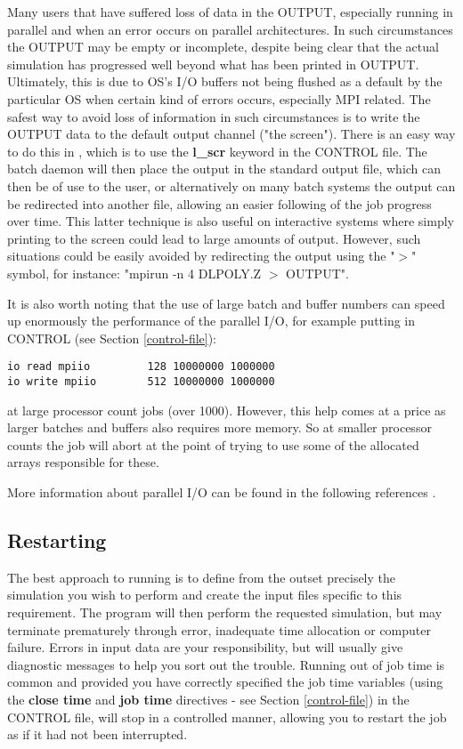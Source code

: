 Many users that have suffered loss of data in the OUTPUT, especially
running in parallel and when an error occurs on parallel architectures.
In such circumstances the OUTPUT may be empty or incomplete, despite
being clear that the actual simulation has progressed well beyond what
has been printed in OUTPUT.  Ultimately, this is due to OS's I/O
buffers not being flushed as a default by the particular OS when
certain kind of errors occurs, especially MPI related.  The safest way
to avoid loss of information in such circumstances is to write the
OUTPUT data to the default output channel ("the screen").  There is an
easy way to do this in \D, which is to use the {\bf l\_scr} keyword in
the CONTROL file.  The batch daemon will then place the output in the
standard output file, which can then be of use to the user, or
alternatively on many batch systems the output can be redirected into
another file, allowing an easier following of the job progress over
time.  This latter technique is also useful on interactive systems
where simply printing to the screen could lead to large amounts of
output.  However, such situations could be easily avoided by
redirecting the output using the "$>$" symbol, for instance:
"mpirun -n 4 DLPOLY.Z $>$ OUTPUT".

It is also worth noting that the use of large batch and buffer
numbers can speed up enormously the performance of the parallel I/O,
for example putting in CONTROL (see Section \ref{control-file}):
\begin{verbatim}
io read mpiio         128 10000000 1000000
io write mpiio        512 10000000 1000000
\end{verbatim}
at large processor count jobs (over 1000).  However, this help comes
at a price as larger batches and buffers also requires more memory.
So at smaller processor counts the job will abort at the point of
trying to use some of the allocated arrays responsible for these.

More information about \D parallel I/O can be found in the following
references \cite{todorov-09a,todorov-08a,bush-10a}.

\subsection{Restarting}

The best approach to running \D is to define from the outset
precisely the simulation you wish to perform and create the input
files specific to this requirement.  The program will then perform
the requested simulation, but may terminate prematurely through
error, inadequate time allocation or computer failure.  Errors in
input data are your responsibility, but \D will usually give
diagnostic messages to help you sort out the trouble.  Running out
of job time is common and provided you have correctly specified
the job time variables (using the {\bf close time} and {\bf job
time} directives - see Section \ref{control-file}) in the CONTROL
file, \D will stop in a controlled manner, allowing you to restart
the job as if it had not been interrupted.

